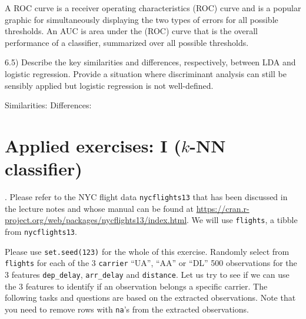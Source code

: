 \documentclass[
  11pt,
]{article}
\newenvironment{Shaded}{\begin{snugshade}}{\end{snugshade}}
\newcommand{\DecValTok}[1]{\textcolor[rgb]{0.00,0.00,0.81}{#1}}
\newcommand{\FunctionTok}[1]{\textcolor[rgb]{0.00,0.00,0.00}{#1}}
\newcommand{\NormalTok}[1]{#1}
\newcommand{\OtherTok}[1]{\textcolor[rgb]{0.56,0.35,0.01}{#1}}
\newcommand{\SpecialCharTok}[1]{\textcolor[rgb]{0.00,0.00,0.00}{#1}}
\newcommand{\StringTok}[1]{\textcolor[rgb]{0.31,0.60,0.02}{#1}}
\begin{document}
A ROC curve is a receiver operating characteristics (ROC) curve and is a
popular graphic for simultaneously displaying the two types of errors
for all possible thresholds. An AUC is area under the (ROC) curve that
is the overall performance of a classifier, summarized over all possible
thresholds.

6.5) Describe the key similarities and differences, respectively,
between LDA and logistic regression. Provide a situation where
discriminant analysis can still be sensibly applied but logistic
regression is not well-defined.

Similarities: Differences:

\hypertarget{applied-exercises-i-k-nn-classifier}{%
\section{\texorpdfstring{Applied exercises: I (\(k\)-NN
classifier)}{Applied exercises: I (k-NN classifier)}}\label{applied-exercises-i-k-nn-classifier}}

. Please refer to the NYC flight data \texttt{nycflights13} that has
been discussed in the lecture notes and whose manual can be found at
\url{https://cran.r-project.org/web/packages/nycflights13/index.html}.
We will use \texttt{flights}, a tibble from \texttt{nycflights13}.

Please use \texttt{set.seed(123)} for the whole of this exercise.
Randomly select from \texttt{flights} for each of the 3 \texttt{carrier}
``UA'', ``AA'' or ``DL'' 500 observations for the 3 features
\texttt{dep\_delay}, \texttt{arr\_delay} and \texttt{distance}. Let us
try to see if we can use the 3 features to identify if an observation
belongs a specific carrier. The following tasks and questions are based
on the extracted observations. Note that you need to remove rows with
\texttt{na}'s from the extracted observations.

\begin{Shaded}
\end{Shaded}
\end{document}
